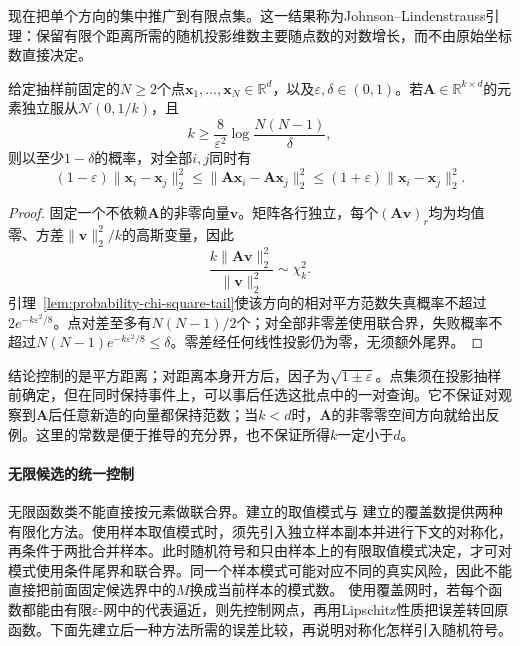 现在把单个方向的集中推广到有限点集。这一结果称为Johnson--Lindenstrauss引理：保留有限个距离所需的随机投影维数主要随点数的对数增长，而不由原始坐标数直接决定。
\begin{theorem}[高斯随机投影的距离保持]
  \label{thm:probability-johnson-lindenstrauss}
  给定抽样前固定的\(N\geq2\)个点\(\bm x_1,\ldots,\bm x_N\in\mathbb R^d\)，以及\(\varepsilon,\delta\in(0,1)\)。若\(\bm A\in\mathbb R^{k\times d}\)的元素独立服从\(\mathcal N(0,1/k)\)，且
  \[
    k\geq\frac8{\varepsilon^2}\log\frac{N(N-1)}\delta,
  \]
  则以至少\(1-\delta\)的概率，对全部\(i,j\)同时有
  \begin{equation}
    (1-\varepsilon)\|\bm x_i-\bm x_j\|_2^2
    \leq\|\bm A\bm x_i-\bm A\bm x_j\|_2^2
    \leq(1+\varepsilon)\|\bm x_i-\bm x_j\|_2^2.
    \label{eq:probability-jl-distance-preservation}
  \end{equation}
\end{theorem}
\begin{proof}
固定一个不依赖\(\bm A\)的非零向量\(\bm v\)。矩阵各行独立，每个\((\bm A\bm v)_r\)均为均值零、方差\(\|\bm v\|_2^2/k\)的高斯变量，因此
\[
  \frac{k\|\bm A\bm v\|_2^2}{\|\bm v\|_2^2}\sim\chi_k^2.
\]
引理~\ref{lem:probability-chi-square-tail}使该方向的相对平方范数失真概率不超过\(2e^{-k\varepsilon^2/8}\)。点对差至多有\(N(N-1)/2\)个；对全部非零差使用联合界，失败概率不超过\(N(N-1)e^{-k\varepsilon^2/8}\leq\delta\)。零差经任何线性投影仍为零，无须额外尾界。
\end{proof}
结论控制的是平方距离；对距离本身开方后，因子为\(\sqrt{1\pm\varepsilon}\)。点集须在投影抽样前确定，但在同时保持事件上，可以事后任选这批点中的一对查询。它不保证对观察到\(\bm A\)后任意新造的向量都保持范数；当\(k<d\)时，\(\bm A\)的非零零空间方向就给出反例。这里的常数是便于推导的充分界，也不保证所得\(k\)一定小于\(d\)。

\paragraph{无限候选的统一控制}
无限函数类不能直接按元素做联合界。建立的取值模式与
建立的覆盖数提供两种
有限化方法。使用样本取值模式时，须先引入独立样本副本并进行下文的对称化，再条件于两批合并样本。此时随机符号和只由样本上的有限取值模式决定，才可对模式使用条件尾界和联合界。同一个样本模式可能对应不同的真实风险，因此不能直接把前面固定候选界中的\(M\)换成当前样本的模式数。
使用覆盖网时，若每个函数都能由有限\(\varepsilon\)-网中的代表逼近，则先控制网点，再用Lipschitz性质把误差转回原函数。下面先建立后一种方法所需的误差比较，再说明对称化怎样引入随机符号。

